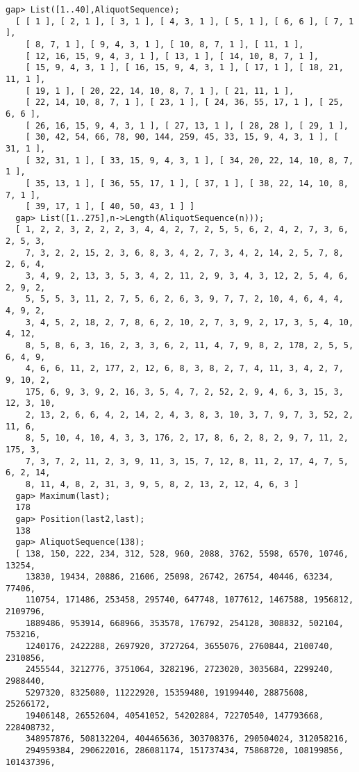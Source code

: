\documentclass[a4paper,11pt]{report}
\begin{document}
{{\begin{Verbatim}[fontsize=\small,frame=single,label=GAP session log]
  gap> List([1..40],AliquotSequence);
  [ [ 1 ], [ 2, 1 ], [ 3, 1 ], [ 4, 3, 1 ], [ 5, 1 ], [ 6, 6 ], [ 7, 1 ], 
    [ 8, 7, 1 ], [ 9, 4, 3, 1 ], [ 10, 8, 7, 1 ], [ 11, 1 ], 
    [ 12, 16, 15, 9, 4, 3, 1 ], [ 13, 1 ], [ 14, 10, 8, 7, 1 ], 
    [ 15, 9, 4, 3, 1 ], [ 16, 15, 9, 4, 3, 1 ], [ 17, 1 ], [ 18, 21, 11, 1 ], 
    [ 19, 1 ], [ 20, 22, 14, 10, 8, 7, 1 ], [ 21, 11, 1 ], 
    [ 22, 14, 10, 8, 7, 1 ], [ 23, 1 ], [ 24, 36, 55, 17, 1 ], [ 25, 6, 6 ], 
    [ 26, 16, 15, 9, 4, 3, 1 ], [ 27, 13, 1 ], [ 28, 28 ], [ 29, 1 ], 
    [ 30, 42, 54, 66, 78, 90, 144, 259, 45, 33, 15, 9, 4, 3, 1 ], [ 31, 1 ], 
    [ 32, 31, 1 ], [ 33, 15, 9, 4, 3, 1 ], [ 34, 20, 22, 14, 10, 8, 7, 1 ], 
    [ 35, 13, 1 ], [ 36, 55, 17, 1 ], [ 37, 1 ], [ 38, 22, 14, 10, 8, 7, 1 ], 
    [ 39, 17, 1 ], [ 40, 50, 43, 1 ] ]
  gap> List([1..275],n->Length(AliquotSequence(n)));
  [ 1, 2, 2, 3, 2, 2, 2, 3, 4, 4, 2, 7, 2, 5, 5, 6, 2, 4, 2, 7, 3, 6, 2, 5, 3, 
    7, 3, 2, 2, 15, 2, 3, 6, 8, 3, 4, 2, 7, 3, 4, 2, 14, 2, 5, 7, 8, 2, 6, 4, 
    3, 4, 9, 2, 13, 3, 5, 3, 4, 2, 11, 2, 9, 3, 4, 3, 12, 2, 5, 4, 6, 2, 9, 2, 
    5, 5, 5, 3, 11, 2, 7, 5, 6, 2, 6, 3, 9, 7, 7, 2, 10, 4, 6, 4, 4, 4, 9, 2, 
    3, 4, 5, 2, 18, 2, 7, 8, 6, 2, 10, 2, 7, 3, 9, 2, 17, 3, 5, 4, 10, 4, 12, 
    8, 5, 8, 6, 3, 16, 2, 3, 3, 6, 2, 11, 4, 7, 9, 8, 2, 178, 2, 5, 5, 6, 4, 9, 
    4, 6, 6, 11, 2, 177, 2, 12, 6, 8, 3, 8, 2, 7, 4, 11, 3, 4, 2, 7, 9, 10, 2, 
    175, 6, 9, 3, 9, 2, 16, 3, 5, 4, 7, 2, 52, 2, 9, 4, 6, 3, 15, 3, 12, 3, 10, 
    2, 13, 2, 6, 6, 4, 2, 14, 2, 4, 3, 8, 3, 10, 3, 7, 9, 7, 3, 52, 2, 11, 6, 
    8, 5, 10, 4, 10, 4, 3, 3, 176, 2, 17, 8, 6, 2, 8, 2, 9, 7, 11, 2, 175, 3, 
    7, 3, 7, 2, 11, 2, 3, 9, 11, 3, 15, 7, 12, 8, 11, 2, 17, 4, 7, 5, 6, 2, 14, 
    8, 11, 4, 8, 2, 31, 3, 9, 5, 8, 2, 13, 2, 12, 4, 6, 3 ]
  gap> Maximum(last);
  178
  gap> Position(last2,last);
  138
  gap> AliquotSequence(138);
  [ 138, 150, 222, 234, 312, 528, 960, 2088, 3762, 5598, 6570, 10746, 13254, 
    13830, 19434, 20886, 21606, 25098, 26742, 26754, 40446, 63234, 77406, 
    110754, 171486, 253458, 295740, 647748, 1077612, 1467588, 1956812, 2109796, 
    1889486, 953914, 668966, 353578, 176792, 254128, 308832, 502104, 753216, 
    1240176, 2422288, 2697920, 3727264, 3655076, 2760844, 2100740, 2310856, 
    2455544, 3212776, 3751064, 3282196, 2723020, 3035684, 2299240, 2988440, 
    5297320, 8325080, 11222920, 15359480, 19199440, 28875608, 25266172, 
    19406148, 26552604, 40541052, 54202884, 72270540, 147793668, 228408732, 
    348957876, 508132204, 404465636, 303708376, 290504024, 312058216, 
    294959384, 290622016, 286081174, 151737434, 75868720, 108199856, 101437396, 

\end{Verbatim}}}
\end{document}

